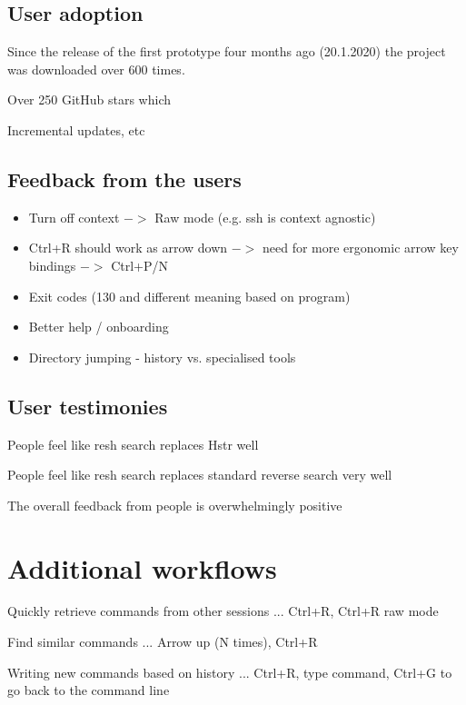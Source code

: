 \subsection{User adoption}

Since the release of the first prototype four months ago (20.1.2020) the project was downloaded over 600 times.

Over 250 GitHub stars which 


Incremental updates, etc

\subsection{Feedback from the users}

\begin{itemize}
    \item Turn off context $->$ Raw mode (e.g. ssh is context agnostic)
    \item Ctrl+R should work as arrow down $->$ need for more ergonomic arrow key bindings $->$ Ctrl+P/N
    \item Exit codes (130 and different meaning based on program)
    \item Better help / onboarding
    \item Directory jumping - history vs. specialised tools
\end{itemize}

\subsection{User testimonies}

People feel like resh search replaces Hstr well

People feel like resh search replaces standard reverse search very well

The overall feedback from people is overwhelmingly positive

\section{Additional workflows}

Quickly retrieve commands from other sessions ... Ctrl+R, Ctrl+R raw mode

Find similar commands ... Arrow up (N times), Ctrl+R

Writing new commands based on history ... Ctrl+R, type command, Ctrl+G to go back to the command line


